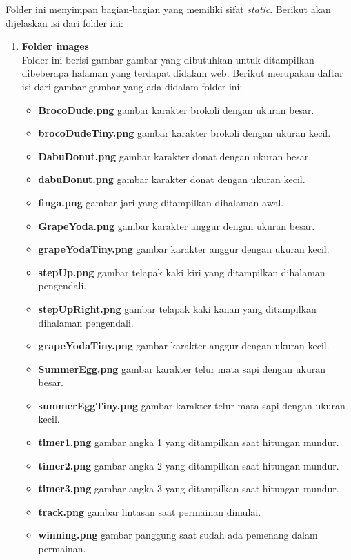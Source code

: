 \begin{enumerate}
	Folder ini menyimpan bagian-bagian yang memiliki sifat \textit{static}. Berikut akan dijelaskan isi dari folder ini:
	\begin{enumerate}
		\item \textbf{Folder images} \\
		Folder ini berisi gambar-gambar yang dibutuhkan untuk ditampilkan dibeberapa halaman yang terdapat didalam web. Berikut merupakan daftar isi dari gambar-gambar yang ada didalam folder ini: 
		\begin{itemize}
			\item \textbf{BrocoDude.png} gambar karakter brokoli dengan ukuran besar.
			\item \textbf{brocoDudeTiny.png} gambar karakter brokoli dengan ukuran kecil.
			\item \textbf{DabuDonut.png} gambar karakter donat dengan ukuran besar.
			\item \textbf{dabuDonut.png} gambar karakter donat dengan ukuran kecil.
			\item \textbf{finga.png} gambar jari yang ditampilkan dihalaman awal.
			\item \textbf{GrapeYoda.png} gambar karakter anggur dengan ukuran besar.
			\item \textbf{grapeYodaTiny.png} gambar karakter anggur dengan ukuran kecil.
			\item \textbf{stepUp.png} gambar telapak kaki kiri yang ditampilkan dihalaman pengendali.
			\item \textbf{stepUpRight.png} gambar telapak kaki kanan yang ditampilkan dihalaman pengendali.
			\item \textbf{grapeYodaTiny.png} gambar karakter anggur dengan ukuran kecil.
			\item \textbf{SummerEgg.png} gambar karakter telur mata sapi dengan ukuran besar.
			\item \textbf{summerEggTiny.png} gambar karakter telur mata sapi dengan ukuran kecil.
			\item \textbf{timer1.png} gambar angka 1 yang ditampilkan saat hitungan mundur.
			\item \textbf{timer2.png} gambar angka 2 yang ditampilkan saat hitungan mundur.
			\item \textbf{timer3.png} gambar angka 3 yang ditampilkan saat hitungan mundur.
			\item \textbf{track.png} gambar lintasan saat permainan dimulai.
			\item \textbf{winning.png} gambar panggung saat sudah ada pemenang dalam permainan.
		\end{itemize}
	

\end{enumerate}
\end{enumerate}
